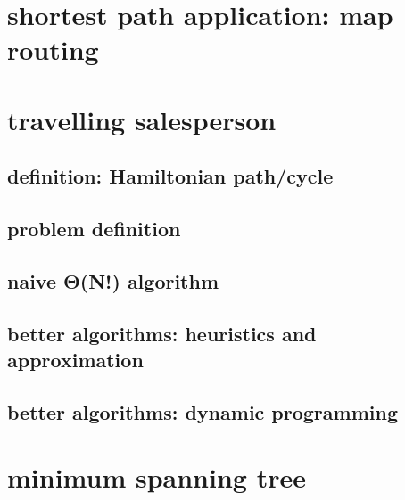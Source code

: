 \section{shortest path application: map routing} %

\section{travelling salesperson}

\subsection{definition: Hamiltonian path/cycle}

\subsection{problem definition}

\subsection{naive Θ(N!) algorithm}

\subsection{better algorithms: heuristics and approximation}

\subsection{better algorithms: dynamic programming}

\section{minimum spanning tree}

